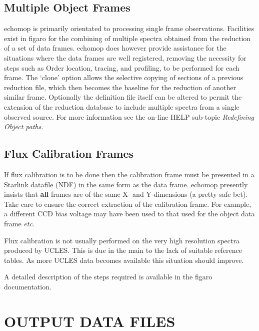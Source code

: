 \documentclass[11pt,twoside]{article}
\newcommand{\stardocinitials}  {SUN}
\newcommand{\stardocnumber}    {152.4}
\newcommand{\stardocname}{\stardocinitials /\stardocnumber}
\newcommand{\xref}[3]{#1}
\newcommand{\xlabel}[1]{}
\newcommand{\mlabel}[1]{\xlabel{#1}\label{#1}}
\newcommand{\myindex}[1]{\index{#1}}
\renewcommand{\myindex}[1]{}
\begin{document}
\subsection{\mlabel{multi_object_frames}Multiple Object Frames}
\myindex{Object frames!multiple}
\myindex{Multiple object frames}

{\sc echomop} is primarily orientated to processing single frame observations.
Facilities exist in \xref{{\sc figaro}}{sun86}{} for the combining of multiple
spectra obtained from the reduction of a set of data frames.  {\sc echomop}
does however provide
assistance for the situations where the data frames are well registered,
removing the necessity for steps such as Order location, tracing, and
profiling, to be performed for each frame.  The `clone' option allows the
selective copying of sections of a previous reduction file, which then
becomes the baseline for the reduction of another similar frame.
Optionally the definition file itself can be altered to permit the
extension of the reduction database to include multiple spectra
from a single observed source.
For more information see the on-line HELP sub-topic
{\sl Redefining Object paths}.


\subsection{\mlabel{flux_calibration_frames}Flux Calibration Frames}
\myindex{Flux calibration!frames}

If flux calibration is to be done then the calibration frame must be
presented in a Starlink datafile (\xref{NDF}{sun33}{}) in the same form
as the data frame.
{\sc echomop} presently insists that {\bf all} frames are of the same X- and
Y-dimensions (a pretty safe bet).  Take care to ensure
the correct extraction of the calibration frame.  For example, a
different CCD bias voltage may have been used to that used for the
object data frame {\it etc.}

Flux calibration is not usually performed on the very high resolution
spectra produced by UCLES.  This is due in the main to the lack of suitable
reference tables.  As more UCLES data becomes available this situation
should improve.

A detailed description of the steps required is available in the
\xref{{\sc figaro}}{sun86}{} \xref{documentation}{sun86}{flux_calib}.


\section{\mlabel{output_files}OUTPUT DATA FILES}
\markboth{OUTPUT DATA FILES}{\stardocname}
\myindex{Output files}
\myindex{Saving results}
\end{document}
